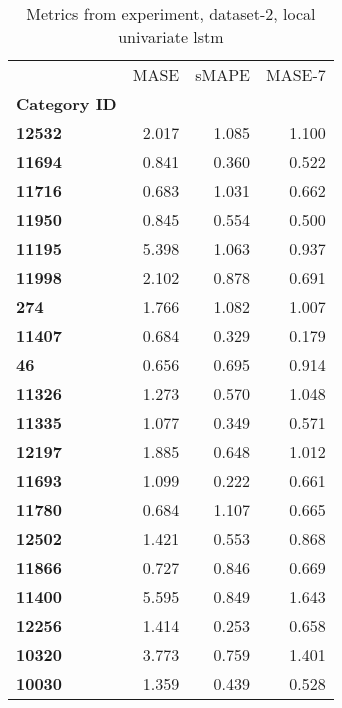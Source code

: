 \begin{table}[h]
\centering
\caption{Metrics from experiment, dataset-2, local univariate lstm}
\label{table:local-univariate-lstm-dataset-2}
\begin{tabular}{lrrr}
\toprule
{} &   MASE &  sMAPE &  MASE-7 \\
\textbf{Category ID} &        &        &         \\
\midrule
\textbf{12532      } &  2.017 &  1.085 &   1.100 \\
\textbf{11694      } &  0.841 &  0.360 &   0.522 \\
\textbf{11716      } &  0.683 &  1.031 &   0.662 \\
\textbf{11950      } &  0.845 &  0.554 &   0.500 \\
\textbf{11195      } &  5.398 &  1.063 &   0.937 \\
\textbf{11998      } &  2.102 &  0.878 &   0.691 \\
\textbf{274        } &  1.766 &  1.082 &   1.007 \\
\textbf{11407      } &  0.684 &  0.329 &   0.179 \\
\textbf{46         } &  0.656 &  0.695 &   0.914 \\
\textbf{11326      } &  1.273 &  0.570 &   1.048 \\
\textbf{11335      } &  1.077 &  0.349 &   0.571 \\
\textbf{12197      } &  1.885 &  0.648 &   1.012 \\
\textbf{11693      } &  1.099 &  0.222 &   0.661 \\
\textbf{11780      } &  0.684 &  1.107 &   0.665 \\
\textbf{12502      } &  1.421 &  0.553 &   0.868 \\
\textbf{11866      } &  0.727 &  0.846 &   0.669 \\
\textbf{11400      } &  5.595 &  0.849 &   1.643 \\
\textbf{12256      } &  1.414 &  0.253 &   0.658 \\
\textbf{10320      } &  3.773 &  0.759 &   1.401 \\
\textbf{10030      } &  1.359 &  0.439 &   0.528 \\
\bottomrule
\end{tabular}
\end{table}
